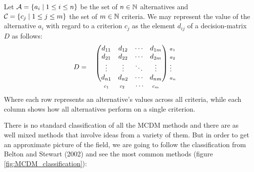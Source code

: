 \begin{definition} 
    Let $\mathcal{A} =\{a_i\mid 1\leq i \leq n\} $ be the set of $n\in \mathbb{N}$ alternatives and $\mathcal{C} =\{c_j\mid 1\leq j \leq m\}$ the set of $m \in \mathbb{N}$ criteria. We may represent the value of the alternative $a_i$ with regard to a criterion $c_j$ as the element $d_{ij}$ of a decision-matrix $D$ as follows:
    \[D=
\setlength{\arraycolsep}{5pt} %
\begin{array}{c@{\,}l}
  \begin{array}{c}
    \begin{pmatrix}
      d_{11} & d_{12} & \cdots & d_{1m} \\
      d_{21} & d_{22} & \cdots & d_{2m} \\
      \vdots & \vdots & \ddots & \vdots \\
      d_{n1} & d_{n2} & \cdots & d_{nm}
    \end{pmatrix} \\[2mm] %
    \begin{array}{llll}
      \scriptstyle c_1 \hspace{1mm}& \hspace{1mm}\scriptstyle c_2 \hspace{1mm} & \hspace{1mm}\cdots  &   \hspace{1mm}\scriptstyle c_m
    \end{array}
  \end{array}
  \hspace{-2.5mm}
  \begin{array}{l}
    \scriptstyle a_1 \\%
    \scriptstyle a_2 \\%
    \scriptstyle \vdots \\%
    \scriptstyle a_n\\
    \\
  \end{array}
\end{array}
\]
Where each row represents an alternative's values across all criteria, while each column shows how all alternatives perform on a single criterion.
    
\end{definition}


There is no standard classification of all the MCDM methods and there are as well mixed methods that involve ideas from a variety of them. But in order to get an approximate picture of the field, we are going to follow the classification from Belton and Stewart (2002) and see the most common methods (figure \ref{fig:MCDM_classification}):

